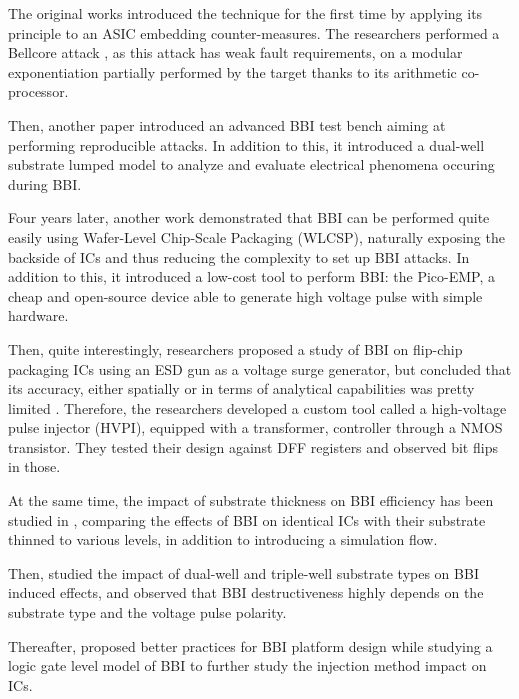 		The original works \cite{bbiOrigin, bbiSecond} introduced the technique for the first time by applying its principle to an ASIC embedding counter-measures.
		The researchers performed a Bellcore attack \cite{bellcore}, as this attack has weak fault requirements, on a modular exponentiation partially performed by the target thanks to its arithmetic co-processor.
		
		Then, another paper \cite{bbiThird} introduced an advanced BBI test bench aiming at performing reproducible attacks.
		In addition to this, it introduced a dual-well substrate lumped model to analyze and evaluate electrical phenomena occuring during BBI.
		
		Four years later, another work \cite{bbiColin} demonstrated that BBI can be performed quite easily using Wafer-Level Chip-Scale Packaging (WLCSP), naturally exposing the backside of ICs and thus reducing the complexity to set up BBI attacks.
		In addition to this, it introduced a low-cost tool to perform BBI: the Pico-EMP, a cheap and open-source device able to generate high voltage pulse with simple hardware.
		
		Then, quite interestingly, researchers proposed a study of BBI on flip-chip packaging ICs using an ESD gun as a voltage surge generator, but concluded that its accuracy, either spatially or in terms of analytical capabilities was pretty limited \cite{japbbi, japbbi2}.
		Therefore, the researchers developed a custom tool called a high-voltage pulse injector (HVPI), equipped with a transformer, controller through a NMOS transistor.
		They tested their design against DFF registers and observed bit flips in those.
		
		At the same time, the impact of substrate thickness on BBI efficiency has been studied in \cite{mybbiCosade}, comparing the effects of BBI on identical ICs with their substrate thinned to various levels, in addition to introducing a simulation flow.
		
		Then, \cite{mybbiFdtc2022} studied the impact of dual-well and triple-well substrate types on BBI induced effects, and observed that BBI destructiveness highly depends on the substrate type and the voltage pulse polarity.
		
		Thereafter, \cite{mybbifdtc2023} proposed better practices for BBI platform design while studying a logic gate level model of BBI to further study the injection method impact on ICs.
		
